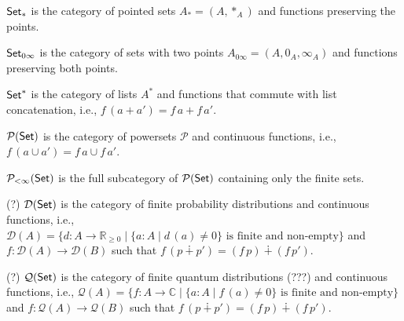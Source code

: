 \documentclass[runningheads,envcountsame]{llncs}
\begin{document}
\begin{definition}
    $\mathsf{Set}_*$ is the category of pointed sets $A_* = (A, *_A)$ and functions preserving the points.
    
    $\mathsf{Set}_{0\infty}$ is the category of sets with two points $A_{0\infty} = (A, 0_A, \infty_A)$ and functions preserving both points.
    
    $\mathsf{Set}^*$ is the category of lists $A^*$ and functions that commute with list concatenation, i.e., $f\,(a + a') = f\,a + f\,a'$.
    
    $\mathcal{P}(\mathsf{Set})$ is the category of powersets $\mathcal{P}$ and continuous functions, i.e., $f\,(a \cup a') = f\,a \cup f\,a'$.
    
    $\mathcal{P}_{<\infty}(\mathsf{Set})$ is the full subcategory of $\mathcal{P}(\mathsf{Set})$ containing only the finite sets.
    
    (?) $\mathcal{D}(\mathsf{Set})$ is the category of finite probability distributions and continuous functions, i.e., $\mathcal{D}(A) = \{ d\colon A \to \mathbb{R}_{\geq0} \mid \{ a\colon A \mid d\,(a) \neq 0 \} \text{ is finite and non-empty} \}$ and
    $f: \mathcal{D}(A) \to \mathcal{D}(B)$ such that $f\,(p \dotplus p') = (f\,p) \dotplus (f\,p')$.
    
    (?) $\mathcal{Q}(\mathsf{Set})$ is the category of finite quantum distributions (???) and continuous functions, i.e., $\mathcal{Q}(A) = \{ f\colon A \to \mathbb{C} \mid \{ a\colon A \mid f\,(a) \neq 0 \} \text{ is finite and non-empty} \}$ and
    $f: \mathcal{Q}(A) \to \mathcal{Q}(B)$ such that $f\,(p \dotplus p') = (f\,p) \dotplus (f\,p')$.
\end{definition}
\end{document}

